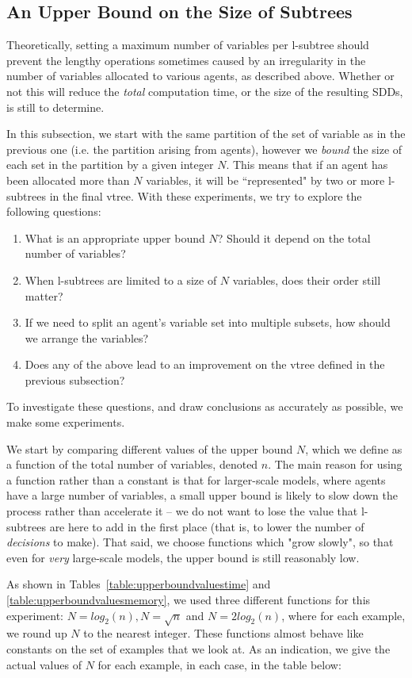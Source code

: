 \documentclass[11pt]{report}
\begin{document}
\subsection{An Upper Bound on the Size of Subtrees}

Theoretically, setting a maximum number of variables per l-subtree should prevent the lengthy operations sometimes caused by an irregularity in the number of variables allocated to various agents, as described above. Whether or not this will reduce the \textit{total} computation time, or the size of the resulting SDDs, is still to determine. 

In this subsection, we start with the same partition of the set of variable as in the previous one (i.e. the partition arising from agents), however we \textit{bound }the size of each set in the partition by a given integer $N$. This means that if an agent has been allocated more than $N$ variables, it will be ``represented" by two or more l-subtrees in the final vtree.
With these experiments, we try to explore the following questions:\begin{enumerate}
\item What is an appropriate upper bound $N$? Should it depend on the total number of variables?
\item When l-subtrees are limited to a size of $N$ variables, does their order still matter?
\item If we need to split an agent's variable set into multiple subsets, how should we arrange the variables? 
\item Does any of the above lead to an improvement on the vtree defined in the previous subsection?
\end{enumerate}
To investigate these questions, and draw conclusions as accurately as possible, we make some experiments.

We start by comparing different values of the upper bound $N$, which we define as a function of the total number of variables, denoted $n$. The main reason for using a function rather than a constant is that for larger-scale models, where agents have a large number of variables, a small upper bound is likely to slow down the process rather than accelerate it -- we do not want to lose the value that l-subtrees are here to add in the first place (that is, to lower the number of \textit{decisions} to make). That said, we choose functions which "grow slowly", so that even for \textit{very }large-scale models, the upper bound is still reasonably low. 

As shown in Tables~\ref{table:upperboundvaluestime} and \ref{table:upperboundvaluesmemory}, we used three different functions for this experiment: $N = log_2(n), N = \sqrt{n}$ and  $N = 2log_2(n)$, where for each example, we round up $N$ to the nearest integer. These functions almost behave like constants on the set of examples that we look at. As an indication, we give the actual values of $N$ for each example, in each case, in the table below: \\
\end{document}
